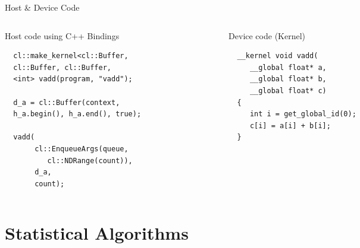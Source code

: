 \documentclass[10pt,aspectratio=169]{beamer} %
\begin{document}
\begin{frame}[fragile,t]{Host \& Device Code}
\vspace{1.5em}
\begin{columns}[t]
\begin{column}{0.5\textwidth}
\alert{Host code using C++ Bindings}
\begin{lstlisting}
  cl::make_kernel<cl::Buffer,
  cl::Buffer, cl::Buffer,
  <int> vadd(program, "vadd");

  d_a = cl::Buffer(context,
  h_a.begin(), h_a.end(), true);

  vadd(
       cl::EnqueueArgs(queue,
          cl::NDRange(count)), 
       d_a,
       count);
\end{lstlisting}
\end{column}%
\hspace{-10pt}
\vrule{}%
\hspace{15pt}
\begin{column}{0.5\textwidth}
\alert{Device code (Kernel)}
\begin{lstlisting}
  __kernel void vadd(                             
     __global float* a,                      
     __global float* b,                      
     __global float* c)               
  {                                          
     int i = get_global_id(0); 
     c[i] = a[i] + b[i];
  }   
\end{lstlisting}
\end{column}
\end{columns}
\end{frame}



\section{Statistical Algorithms}
\end{document}
